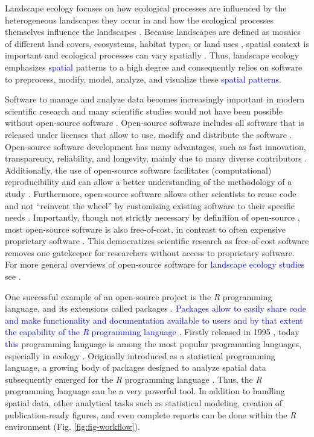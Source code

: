 \documentclass[smallextended]{svjour3}       %
\begin{document}
Landscape ecology focuses on how ecological processes are influenced by the heterogeneous landscapes they occur in and how the ecological processes themselves influence the landscapes \cite{Turner1989,Turner2005,With2019}.
Because landscapes are defined as mosaics of different land covers, ecosystems, habitat types, or land uses \cite{Forman1986,Forman1995,Wiens1995a}, spatial context is important and ecological processes can vary spatially \cite{With2019}.
Thus, landscape ecology emphasizes \textcolor{blue}{spatial} patterns to a high degree \cite{Risser1984} and consequently relies on software to preprocess, modify, model, analyze, and visualize these \textcolor{blue}{spatial patterns}.

Software to manage and analyze data becomes increasingly important in modern scientific research \cite{Wilson2014} and many scientific studies would not have been possible without open-source software \cite{Prlic2012}.
Open-source software includes all software that is released under licenses that allow to use, modify and distribute the software \cite{St.Laurent2008}.
Open-source software development has many advantages, such as fast innovation, transparency, reliability, and longevity, mainly due to many diverse contributors \cite{vonKrogh2006,St.Laurent2008}.
Additionally, the use of open-source software facilitates (computational) reproducibility and can allow a better understanding of the methodology of a study \cite{Prlic2012,Powers2019}.
Furthermore, open-source software allows other scientists to reuse code and not ``reinvent the wheel'' \cite{Prlic2012} by customizing existing software to their specific needs \cite{Steiniger2009}.
Importantly, though not strictly necessary by definition of open-source \cite{Steiniger2009,Steiniger2009a}, most open-source software is also free-of-cost, in contrast to often expensive proprietary software \cite{vonKrogh2006,Steiniger2009,Steiniger2009a}.
This democratizes scientific research as free-of-cost software removes one gatekeeper for researchers without access to proprietary software.
For more general overviews of open-source software for \textcolor{blue}{landscape ecology studies} see \cite{Jolma2008,Steiniger2009,Steiniger2009a,Istvan2012}.

One successful example of an open-source project is the \textit{R} programming language, and its extensions called packages \cite{RCoreTeam2019}.
\textcolor{blue}{Packages allow to easily share code and make functionality and documentation available to users and by that extent the capability of the \textit{R} programming language \cite{Wickham2015}}.
Firstly released in 1995 \cite{Smith2016}, today \textcolor{blue}{this} programming language is among the most popular programming languages, especially in ecology \cite{Lai2019}.
Originally introduced as a statistical programming language, a growing body of packages designed to analyze spatial data subsequently emerged for the \textit{R} programming language \cite{Bivand2006,Lovelace2019}.
Thus, the \textit{R} programming language can be a very powerful tool. In addition to handling spatial data, other analytical tasks such as statistical modeling, creation of publication-ready figures, and even complete reports can be done within the \textit{R} environment (Fig. \ref{fig:fig-workflow}).
\end{document}

